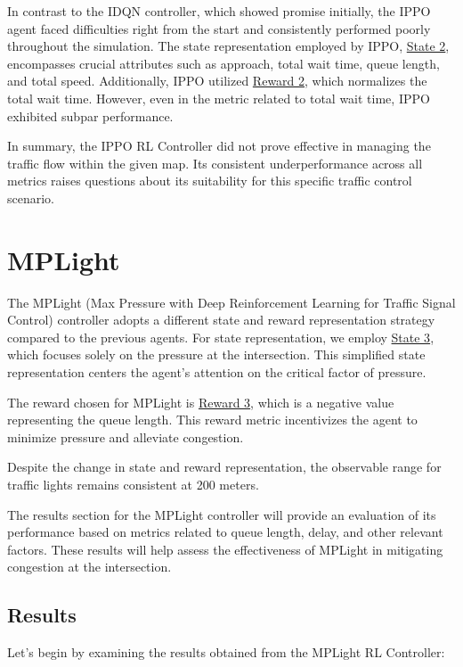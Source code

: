 In contrast to the IDQN controller, which showed promise initially, the IPPO agent faced difficulties right from the start and consistently performed poorly throughout the simulation. The state representation employed by IPPO, \hyperref[subsec:state-2]{State 2}, encompasses crucial attributes such as approach, total wait time, queue length, and total speed. Additionally, IPPO utilized \hyperref[subsec:reward-2]{Reward 2}, which normalizes the total wait time. However, even in the metric related to total wait time, IPPO exhibited subpar performance.

In summary, the IPPO RL Controller did not prove effective in managing the traffic flow within the given map. Its consistent underperformance across all metrics raises questions about its suitability for this specific traffic control scenario.

\section{MPLight} \label{sec:exp-mplight}
The MPLight (Max Pressure with Deep Reinforcement Learning for Traffic Signal Control) controller adopts a different state and reward representation strategy compared to the previous agents. For state representation, we employ \hyperref[subsec:state-3]{State 3}, which focuses solely on the pressure at the intersection. This simplified state representation centers the agent's attention on the critical factor of pressure.

The reward chosen for MPLight is \hyperref[subsec:reward-3]{Reward 3}, which is a negative value representing the queue length. This reward metric incentivizes the agent to minimize pressure and alleviate congestion.

Despite the change in state and reward representation, the observable range for traffic lights remains consistent at 200 meters.

The results section for the MPLight controller will provide an evaluation of its performance based on metrics related to queue length, delay, and other relevant factors. These results will help assess the effectiveness of MPLight in mitigating congestion at the intersection.

\subsection{Results} \label{sec:exp-mplight-results}
Let's begin by examining the results obtained from the MPLight RL Controller:

